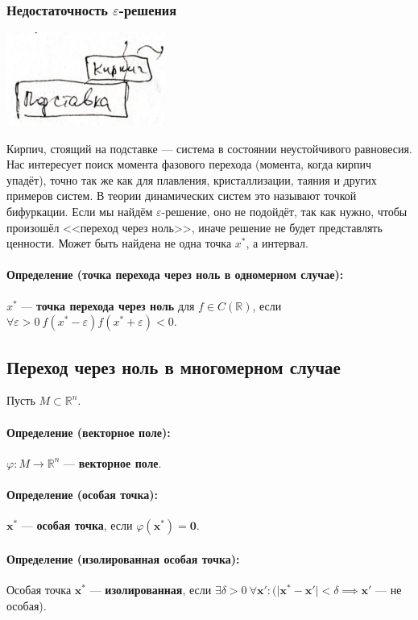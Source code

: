 \subsubsection{Недостаточность $\varepsilon$-решения}
\begin{center}
    \includegraphics[width=5.2cm]{../figures/lection_1/figure_1.png}
\end{center}
Кирпич, стоящий на подставке --- система в состоянии неустойчивого равновесия. Нас интересует поиск момента фазового перехода (момента, когда кирпич упадёт), точно так же как для плавления, кристаллизации, таяния и других примеров систем. В теории динамических систем это называют точкой бифуркации. Если мы найдём $\varepsilon$-решение, оно не подойдёт, так как нужно, чтобы произошёл <<переход через ноль>>, иначе решение не будет представлять ценности. Может быть найдена не одна точка $x^*$, а интервал.
\paragraph{Определение (точка перехода через ноль в одномерном случае):} $x^*$ --- \textbf{точка перехода через ноль} для $f\in C(\mathbb{R})$, если $\forall \varepsilon > 0 \  f(x^*-\varepsilon)f(x^*+\varepsilon) < 0$.
\subsection{Переход через ноль в многомерном случае}
Пусть $M \subset \mathbb{R}^n$.
\paragraph{Определение (векторное поле):} $\varphi:M\rightarrow\mathbb{R}^n$ --- \textbf{векторное поле}.
\paragraph{Определение (особая точка):} $\mathbf{x^*}$ --- \textbf{особая точка}, если $\varphi(\mathbf{x^*})=\mathbf{0}$.
\paragraph{Определение (изолированная особая точка):} Особая точка $\mathbf{x^*}$ --- \textbf{изолированная}, если $\exists \delta > 0 \  \forall \mathbf{x'}: (\vert\mathbf{x^*}-\mathbf{x'}\vert<\delta \implies \mathbf{x'}$ --- не особая).
